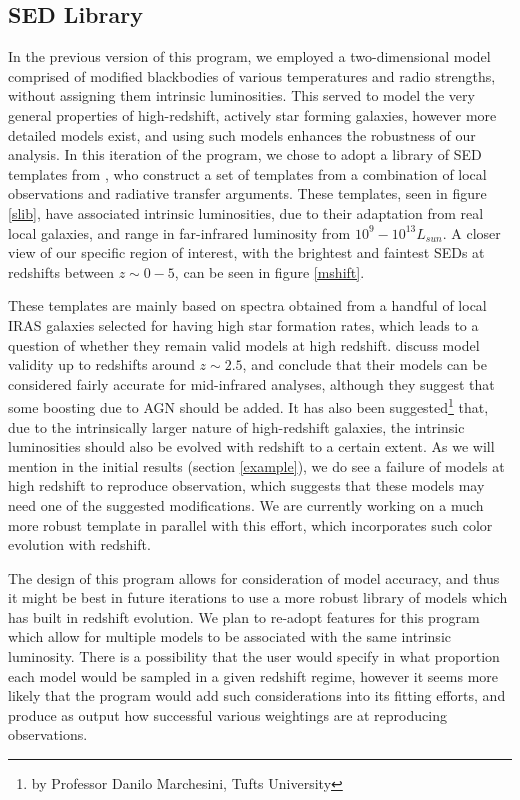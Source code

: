 \documentclass[twocolumn,letterpaper,10pt]{article}
\begin{document}
\subsection{SED Library}\label{sec:SED}

In the previous version of this program, we employed a two-dimensional model comprised of modified blackbodies of various temperatures and radio strengths, without assigning them intrinsic luminosities. This served to model the very general properties of high-redshift, actively star forming galaxies, however more detailed models exist, and using such models enhances the robustness of our analysis. In this iteration of the program, we chose to adopt a library of SED templates from \citet{rieke09}, who construct a set of templates from a combination of local observations and radiative transfer arguments. These templates, seen in figure \ref{slib}, have associated intrinsic luminosities, due to their adaptation from real local galaxies, and range in far-infrared luminosity from $10^9 - 10^{13} L_{sun}$. A closer view of our specific region of interest, with the brightest and faintest SEDs at redshifts between $z\sim 0-5$, can be seen in figure \ref{mshift}.

These templates are mainly based on spectra obtained from a handful of local IRAS galaxies selected for having high star formation rates, which leads to a question of whether they remain valid models at high redshift. \citet{rieke09} discuss model validity up to redshifts around $z\sim2.5$, and conclude that their models can be considered fairly accurate for mid-infrared analyses, although they suggest that some boosting due to AGN should be added. It has also been suggested\footnote{by Professor Danilo Marchesini, Tufts University} that, due to the intrinsically larger nature of high-redshift galaxies, the intrinsic luminosities should also be evolved with redshift to a certain extent. As we will mention in the initial results (section \ref{example}), we do see a failure of models at high redshift to reproduce observation, which suggests that these models may need one of the suggested modifications. We are currently working on a much more robust template in parallel with this effort, which incorporates such color evolution with redshift.

The design of this program allows for consideration of model accuracy, and thus it might be best in future iterations to use a more robust library of models which has built in redshift evolution. We plan to re-adopt features for this program which allow for multiple models to be associated with the same intrinsic luminosity. There is a possibility that the user would specify in what proportion each model would be sampled in a given redshift regime, however it seems more likely that the program would add such considerations into its fitting efforts, and produce as output how successful various weightings are at reproducing observations. 
\end{document}
